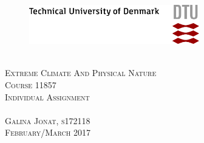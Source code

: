 \begin{titlepage}

\begin{center}


\begin{figure}
      \centering
      \begin{minipage}{0.5\linewidth}
          	\raggedright
              
      \end{minipage}
      \begin{minipage}{0.5\linewidth}
          	\raggedleft
              
      \end{minipage}
\end{figure}

\begin{figure}
\centering
\begin{minipage}{1\textwidth}
  \raggedleft
  \includegraphics[height=17mm]{graphics/frontpage/DTUlogo.png}
\end{minipage}
\end{figure}



\hfill \\[2.5cm]

\textsc{\LARGE Extreme Climate And Physical Nature}\\[0.3cm]

\textsc{\LARGE Course 11857}\\[2cm]

\textsc{\Huge Individual Assignment}\\[3cm]



\hfill \\[4cm]
\textsc{\Large Galina Jonat, s172118 }\\[0.5cm]
\textsc{\Large February/March 2017}\\[0.2cm]


\end{center}
\vfill


\end{titlepage}
